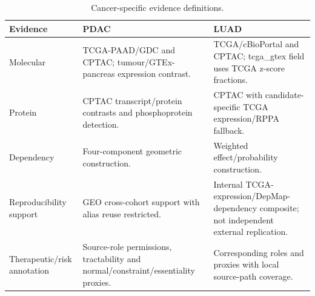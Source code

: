 \begin{table}[!tbp]
\centering\small
\caption{Cancer-specific evidence definitions.}\label{tab:cancer-specific-inputs}
\begin{tabularx}{\textwidth}{p{}YY}\toprule
Evidence & PDAC & LUAD \\ \midrule
Molecular & TCGA-PAAD/GDC and CPTAC; tumour/GTEx-pancreas expression contrast. & TCGA/cBioPortal and CPTAC; tcga\_gtex field uses TCGA z-score fractions. \\
Protein & CPTAC transcript/protein contrasts and phosphoprotein detection. & CPTAC with candidate-specific TCGA expression/RPPA fallback. \\
Dependency & Four-component geometric construction. & Weighted effect/probability construction. \\
Reproducibility support & GEO cross-cohort support with alias reuse restricted. & Internal TCGA-expression/DepMap-dependency composite; not independent external replication. \\
Therapeutic/risk annotation & Source-role permissions, tractability and normal/constraint/essentiality proxies. & Corresponding roles and proxies with local source-path coverage. \\
\bottomrule\end{tabularx}
\end{table}
